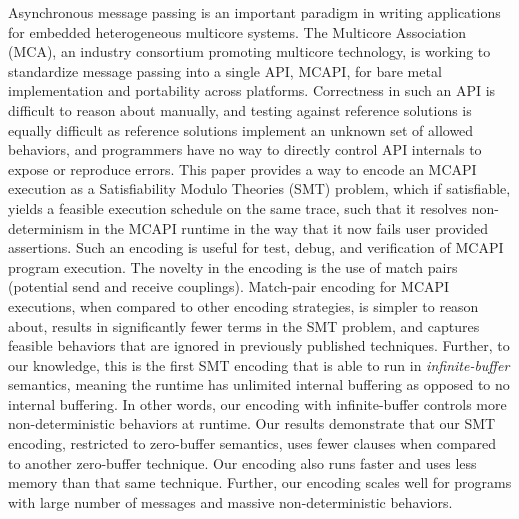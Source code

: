 
Asynchronous message passing is an important paradigm in writing
applications for embedded heterogeneous multicore systems.  The
Multicore Association (MCA), an industry consortium promoting
multicore technology, is working to standardize message passing into a
single API, MCAPI, for bare metal implementation and portability
across platforms.  Correctness in such an API is difficult to reason
about manually, and testing against reference solutions is equally
difficult as reference solutions implement an unknown set of allowed
behaviors, and programmers have no way to directly control API
internals to expose or reproduce errors.  This paper provides a way to
encode an MCAPI execution as a Satisfiability Modulo Theories (SMT)
problem, which if satisfiable, yields a feasible execution schedule on
the same trace, such that it resolves non-determinism in the MCAPI
runtime in the way that it now fails user provided assertions.  Such
an encoding is useful for test, debug, and verification of MCAPI
program execution.  The novelty in the encoding is the use of match
pairs (potential send and receive couplings).  Match-pair encoding for
MCAPI executions, when compared to other encoding strategies, is
simpler to reason about, results in significantly fewer terms in the
SMT problem, and captures feasible behaviors that are ignored in
previously published techniques. Further, to our knowledge, this is
the first SMT encoding that is able to run in \textit{infinite-buffer}
semantics, meaning the runtime has unlimited internal buffering as
opposed to no internal buffering. In other words, our encoding with
infinite-buffer controls more non-deterministic behaviors at runtime.
Our results demonstrate that our SMT encoding, restricted to
zero-buffer semantics, uses fewer clauses when compared to another
zero-buffer technique. Our encoding also runs faster and uses less
memory than that same technique. Further, our encoding scales well for
programs with large number of messages and massive non-deterministic
behaviors.
